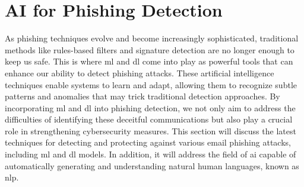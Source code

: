 \begin{comment}
The first step is to understand why people fall for phishing. Something in phishing emails lures the victims into clicking on some malicious link or providing confidential information.~\citet{butavicius2022people} performed a study where the objective was to understand why that happens. For that, they conducted an online experiment, and participants underwent an email classification task designed to examine susceptibility to phishing. In the study's discussion, it was mentioned that participants phishing email detection skills were poor. They correctly identified phishing only 42\% of the time and incorrectly flagged emails that were legitimate 31\% of the time. Despite the emails having leakage cues such as poor grammar, spelling, and punctuation the majority still fell for the attack and clicked the fake malicious link provided. 
\end{comment}



\section{AI for Phishing Detection}


As phishing techniques evolve and become increasingly sophisticated, traditional methods like rules-based filters and signature detection are no longer enough to keep us safe. This is where \ac{ml} and \ac{dl} come into play as powerful tools that can enhance our ability to detect phishing attacks. These artificial intelligence techniques enable systems to learn and adapt, allowing them to recognize subtle patterns and anomalies that may trick traditional detection approaches.
By incorporating \ac{ml} and \ac{dl} into phishing detection, we not only aim to address the difficulties of identifying these deceitful communications but also play a crucial role in strengthening cybersecurity measures.
This section will discuss the latest techniques for detecting and protecting against various email phishing attacks, including \ac{ml} and \ac{dl} models. In addition, it will address the field of \ac{ai} capable of automatically generating and understanding natural human languages, known as \ac{nlp}.

